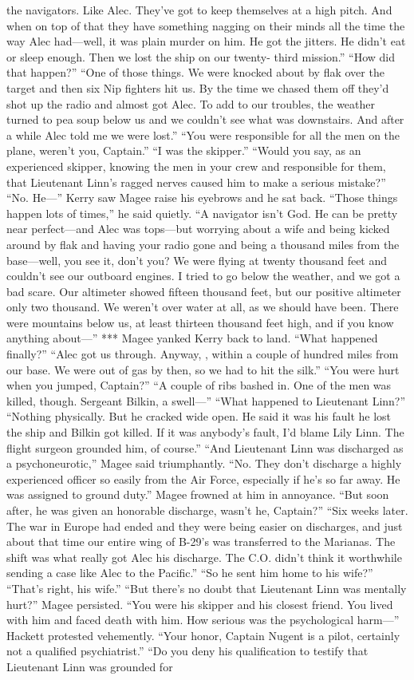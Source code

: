\documentclass{novel}
\begin{document}
the navigators. Like Alec. They’ve got to keep themselves at a high pitch. And when on top of that they have something nagging on their minds all the time the way Alec had—well, it was plain murder on him. He got the jitters. He didn’t eat or sleep enough. Then we lost the ship on our twenty- third mission.” “How did that happen?” “One of those things. We were knocked about by flak over the target and then six Nip fighters hit us. By the time we chased them off they’d shot up the radio and almost got Alec. To add to our troubles, the weather turned to pea soup below us and we couldn’t see what was downstairs. And after a while Alec told me we were lost.” “You were responsible for all the men on the plane, weren’t you, Captain.” “I was the skipper.” “Would you say, as an experienced skipper, knowing the men in your crew and responsible for them, that Lieutenant Linn’s ragged nerves caused him to make a serious mistake?” “No. He—” Kerry saw Magee raise his eyebrows and he sat back. “Those things happen lots of times,” he said quietly. “A navigator isn’t God. He can be pretty near perfect—and Alec was tops—but worrying about a wife and being kicked around by flak and having your radio gone and being a thousand miles from the base—well, you see it, don’t you? We were flying at twenty thousand feet and couldn’t see our outboard engines. I tried to go below the weather, and we got a bad scare. Our altimeter showed fifteen thousand feet, but our positive altimeter only two thousand. We weren’t over water at all, as we should have been. There were mountains below us, at least thirteen thousand feet high, and if you know anything about—” *** Magee yanked Kerry back to land. “What happened finally?” “Alec got us through. Anyway, , within a couple of hundred miles from our base. We were out of gas by then, so we had to hit the silk.” “You were hurt when you jumped, Captain?” “A couple of ribs bashed in. One of the men was killed, though. Sergeant Bilkin, a swell—” “What happened to Lieutenant Linn?” “Nothing physically. But he cracked wide open. He said it was his fault he lost the ship and Bilkin got killed. If it was anybody’s fault, I’d blame Lily Linn. The flight surgeon grounded him, of course.” “And Lieutenant Linn was discharged as a psychoneurotic,” Magee said triumphantly. “No. They don’t discharge a highly experienced officer so easily from the Air Force, especially if he’s so far away. He was assigned to ground duty.” Magee frowned at him in annoyance. “But soon after, he was given an honorable discharge, wasn’t he, Captain?” “Six weeks later. The war in Europe had ended and they were being easier on discharges, and just about that time our entire wing of B-29’s was transferred to the Marianas. The shift was what really got Alec his discharge. The C.O. didn’t think it worthwhile sending a case like Alec to the Pacific.” “So he sent him home to his wife?” “That’s right, his wife.” “But there’s no doubt that Lieutenant Linn was mentally hurt?” Magee persisted. “You were his skipper and his closest friend. You lived with him and faced death with him. How serious was the psychological harm—” Hackett protested vehemently. “Your honor, Captain Nugent is a pilot, certainly not a qualified psychiatrist.” “Do you deny his qualification to testify that Lieutenant Linn was grounded for 
\end{document}
